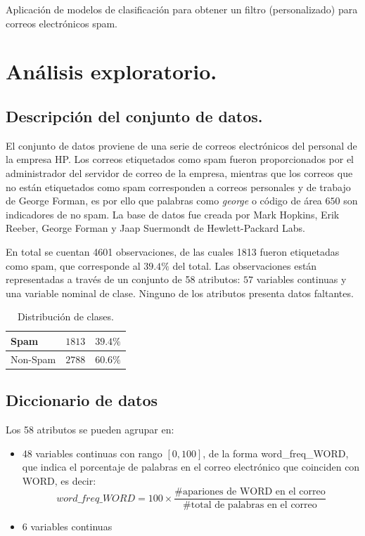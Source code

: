 \documentclass[12pt, letterpaper]{article}
\begin{document}
Aplicación de modelos de clasificación para obtener un filtro (personalizado) para correos electrónicos spam.

\section{Análisis exploratorio.}

\subsection{Descripción del conjunto de datos.}

El conjunto de datos proviene de una serie de correos electrónicos del personal de la empresa HP. Los correos etiquetados como spam fueron proporcionados por el administrador del servidor de correo de la empresa, mientras que los correos que no están etiquetados como spam corresponden a correos personales y de trabajo de George Forman, es por ello que palabras como \textit{george} o código de área $650$ son indicadores de no spam. La base de datos fue creada por Mark Hopkins, Erik Reeber, George Forman y Jaap Suermondt de Hewlett-Packard Labs.

En total se cuentan 4601 observaciones, de las cuales 1813 fueron etiquetadas como spam, que corresponde al $39.4\%$ del total. Las observaciones están representadas a través de un conjunto de 58 atributos: $57$ variables continuas y una variable nominal de clase. Ninguno de los atributos presenta datos faltantes.

\begin{table}[ht]
\centering
\begin{tabular}{|l|l|l|}
\hline
Spam     & $1813$ & $39.4 \%$ \\ \hline
Non-Spam & $2788$ & $60.6 \%$ \\ \hline
\end{tabular}
\caption{Distribución de clases.}
\end{table}

\subsection{Diccionario de datos}

Los 58 atributos se pueden agrupar en:

\begin{itemize}
	\item 48 variables continuas con rango $[0,100]$, de la forma word\_freq\_WORD, que indica el porcentaje de palabras en el correo electrónico que coinciden con WORD, es decir:
	$$word\_freq\_WORD = 100 \times \dfrac{\#\text{apariones de WORD en el correo}}{\#\text{total de palabras en el correo}}$$
	\item 6 variables continuas
\end{itemize}
\end{document}

